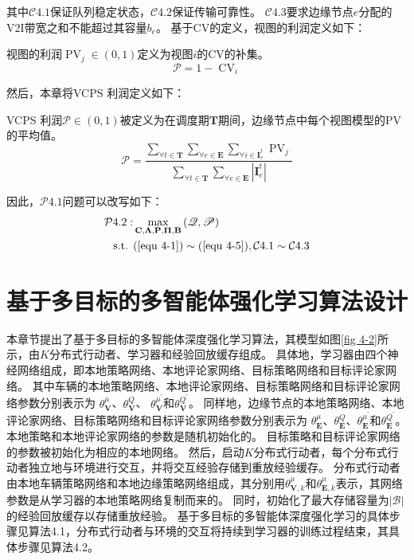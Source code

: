 其中$\mathcal{C}4.1$保证队列稳定状态，$\mathcal{C}4.2$保证传输可靠性。
$\mathcal{C}4.3$要求边缘节点$e$分配的V2I带宽之和不能超过其容量$b_e$。
基于CV的定义，视图的利润定义如下：
\begin{definition}
视图的利润$\operatorname{PV}_{j} \in (0, 1)$定义为视图$i$的CV的补集。
	\begin{equation}
		\mathscr{P}= 1 - \operatorname{CV}_{i}
	\end{equation}
\end{definition}
\noindent 然后，本章将VCPS 利润定义如下：
\begin{definition}
VCPS 利润$\mathscr{P} \in (0, 1)$被定义为在调度期$\mathbf{T}$期间，边缘节点中每个视图模型的PV的平均值。
	\begin{equation}
		\mathscr{P}= \frac{\sum_{\forall t \in \mathbf{T}} \sum_{\forall e \in \mathbf{E}} \sum_{\forall i \in \mathbf{I}_e^t}   \operatorname{PV}_{j} }{\sum_{\forall t \in \mathbf{T}} \sum_{\forall e \in \mathbf{E}} |\mathbf{I}_e^t| }
	\end{equation}
\end{definition}
\noindent 因此，$\mathcal{P}4.1$问题可以改写如下：
\begin{align}
	\mathcal{P}4.2: & \max_{ \mathbf{C}, \bf\Lambda, \mathbf{P}, \bf\Pi, \mathbf{B} } \left (\mathscr{Q}, \mathscr{P} \right ) \notag \\
		\text { s.t. }
	&(\ref{equ 4-1}) \sim (\ref{equ 4-5}), \mathcal{C}4.1 \sim \mathcal{C}4.3
\end{align}

\section[\hspace{-2pt}基于多目标的多智能体强化学习算法设计]{{ \hspace{-8pt}基于多目标的多智能体强化学习算法设计}}\label{section 4-5}

本章节提出了基于多目标的多智能体深度强化学习算法，其模型如图\ref{fig 4-2}所示，由$K$分布式行动者、学习器和经验回放缓存组成。
具体地，学习器由四个神经网络组成，即本地策略网络、本地评论家网络、目标策略网络和目标评论家网络。
其中车辆的本地策略网络、本地评论家网络、目标策略网络和目标评论家网络参数分别表示为 $\theta_{\mathbf{V}}^{\mu}$、$\theta_{\mathbf{V}}^{Q}$、 $\theta_{\mathbf{V}}^{\mu^{\prime}}$和$\theta_{\mathbf{V}}^{Q^{\prime}}$。
同样地，边缘节点的本地策略网络、本地评论家网络、目标策略网络和目标评论家网络参数分别表示为 $\theta_{\mathbf{E}}^{\mu}$、$\theta_{\mathbf{E}}^{Q}$、$\theta_{\mathbf{E}}^{\mu^{\prime}}$和$\theta_{\mathbf{E}}^{Q^{\prime}}$。
本地策略和本地评论家网络的参数是随机初始化的。
目标策略和目标评论家网络的参数被初始化为相应的本地网络。
然后，启动$K$分布式行动者，每个分布式行动者独立地与环境进行交互，并将交互经验存储到重放经验缓存。
分布式行动者由本地车辆策略网络和本地边缘策略网络组成，其分别用$\theta_{\mathbf{V}, k}^{\mu}$和$\theta_{\mathbf{E}, k}^{\mu}$表示，其网络参数是从学习器的本地策略网络复制而来的。
同时，初始化了最大存储容量为$|\mathcal{B}|$的经验回放缓存以存储重放经验。
基于多目标的多智能体深度强化学习的具体步骤见算法4.1，分布式行动者与环境的交互将持续到学习器的训练过程结束，其具体步骤见算法4.2。

